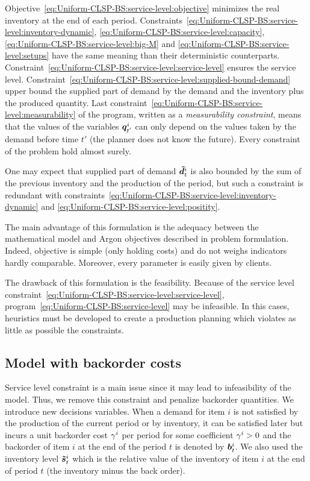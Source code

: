 Objective~\eqref{eq:Uniform-CLSP-BS:service-level:objective} minimizes the real inventory at the end of each period.
Constraints~\eqref{eq:Uniform-CLSP-BS:service-level:inventory-dynamic}, \eqref{eq:Uniform-CLSP-BS:service-level:capacity}, \eqref{eq:Uniform-CLSP-BS:service-level:big-M} and \eqref{eq:Uniform-CLSP-BS:service-level:setups} have the same meaning t{}han their deterministic counterparts.
Constraint~\eqref{eq:Uniform-CLSP-BS:service-level:service-level} ensures the service level.
Constraint~\eqref{eq:Uniform-CLSP-BS:service-level:supplied-bound-demand} upper bound the supplied part of demand by the demand and the inventory plus the produced quantity.
Last constraint~\eqref{eq:Uniform-CLSP-BS:service-level:measurability} of the program, written as a {\em measurability constraint}, means that the values of the variables $\va\quantity_{t'}^i$ can only depend on the values taken by the demand before time $t'$ (the planner does not know the future).
Every constraint of the problem hold almost surely.

One may expect that supplied part of demand $\va\supplied_t^i$ is also bounded by the sum of the previous inventory and the production of the period, but such a constraint is redundant with constraints~\eqref{eq:Uniform-CLSP-BS:service-level:inventory-dynamic} and \eqref{eq:Uniform-CLSP-BS:service-level:positity}.


The main advantage of this formulation is the adequacy between the mathematical model and Argon objectives described in problem formulation. Indeed, objective is simple (only holding costs) and do not weighs indicators hardly comparable. Moreover, every parameter is easily given by clients.

The drawback of this formulation is the feasibility. Because of the service level constraint~\eqref{eq:Uniform-CLSP-BS:service-level:service-level}, program~\eqref{eq:Uniform-CLSP-BS:service-level} may be infeasible. In this cases, heuristics must be developed to create a production planning which violates as little as possible the constraints.



\subsection{Model with backorder costs}


Service level constraint is a main issue since it may lead to infeasibility of the model. Thus, we remove this constraint and penalize backorder quantities. We introduce new decisions variables. When a demand for item $i$ is not satisfied by the production of the current period or by inventory, it can be satisfied later but incurs a unit backorder cost $\gamma^i$ per period for some coefficient $\gamma^i>0$ and the backorder of item $i$ at the end of the period $t$ is denoted by $\va\backlog_t^i$. We also used the inventory level $\va\level_t^i$ which is the relative value of the inventory of item $i$ at the end of period $t$ (\ie the inventory minus the back order).

